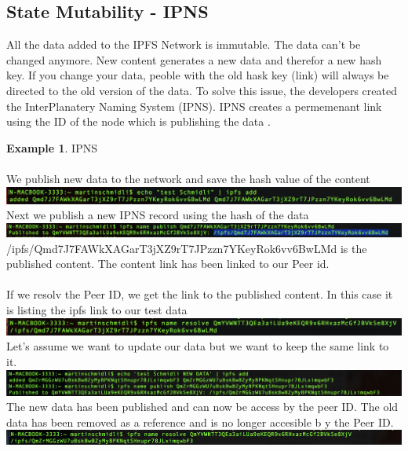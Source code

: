 \documentclass[a4paper,11pt, oneside]{report}
\theoremstyle{definition}
\newtheorem{exmp}{Example}[subsection]
\begin{document}
\subsection{State Mutability - IPNS}
All the data added to the IPFS Network is immutable. The data can't be changed anymore. New content generates a new data and therefor a new hash key. If you change your data, peoble with the old hask key (link) will always be directed to the old version of the data. To solve this issue, the developers created the InterPlanatery Naming System (IPNS). IPNS creates a permemenant link using the ID of the node which is publishing the data .
\begin{exmp} IPNS\\ \\
We publish new data to the network and save the hash value of the content\\[0.3cm]
\includegraphics[width=\textwidth]{img/ipns1.png}\\[0.3cm]
Next we publish a new IPNS record using the hash of the data\\[0.3cm]
\includegraphics[width=\textwidth]{img/ipns2.png}\\[0.3cm]
/ipfs/Qmd7J7FAWkXAGarT3jXZ9rT7JPzzn7YKeyRok6vv6BwLMd is the published content. The content link has been linked to our Peer id.\\ \\
If we resolv the Peer ID, we get the link to the published content. In this case it is listing the ipfs link to our test data\\[0.3cm]
\includegraphics[width=\textwidth]{img/ipns3.png}\\[0.3cm]
Let's assume we want to update our data but we want to keep the same link to it.
\includegraphics[width=\textwidth]{img/ipns4.png}\\[0.3cm]
The new data has been published and can now be access by the peer ID. The old data has been removed as a reference and is no longer accesible b y the Peer ID.\\[0.3cm]
\includegraphics[width=\textwidth]{img/ipns5.png}
\end{exmp}
\end{document}
